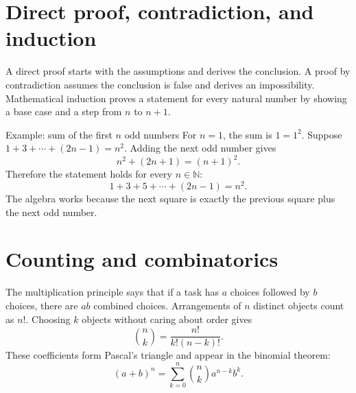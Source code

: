 \documentclass[11pt,oneside,openany]{book}
\newcommand{\N}{\mathbb{N}}
\begin{document}
\section{Direct proof, contradiction, and induction}

A direct proof starts with the assumptions and derives the conclusion. A proof by contradiction assumes the conclusion is false and derives an impossibility. Mathematical induction proves a statement for every natural number by showing a base case and a step from $n$ to $n+1$.

\begin{center}
\end{center}

\begin{proofbox}{Example: sum of the first $n$ odd numbers}
For $n=1$, the sum is $1=1^2$. Suppose $1+3+\cdots+(2n-1)=n^2$. Adding the next odd number gives
\[
  n^2+(2n+1)=(n+1)^2.
\]
Therefore the statement holds for every $n\in\N$:
\[
  1+3+5+\cdots+(2n-1)=n^2.
\]
The algebra works because the next square is exactly the previous square plus the next odd number.
\end{proofbox}

\section{Counting and combinatorics}

The multiplication principle says that if a task has $a$ choices followed by $b$ choices, there are $ab$ combined choices. Arrangements of $n$ distinct objects count as $n!$. Choosing $k$ objects without caring about order gives
\[
  \binom{n}{k}=\frac{n!}{k!(n-k)!}.
\]
These coefficients form Pascal's triangle and appear in the binomial theorem:
\[
  (a+b)^n=\sum_{k=0}^n \binom{n}{k}a^{n-k}b^k.
\]
\end{document}
